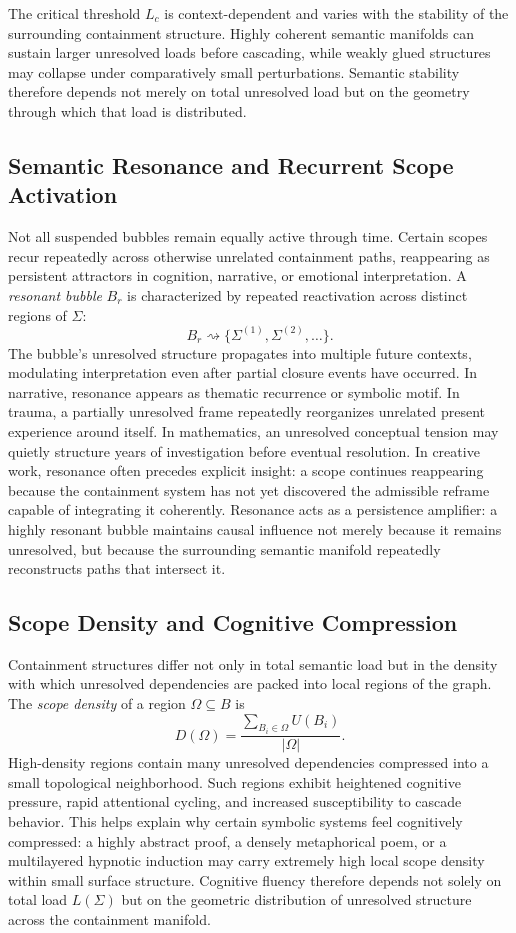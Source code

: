 \documentclass[12pt, a4paper]{article}
\theoremstyle{plain}
\theoremstyle{definition}
\theoremstyle{remark}
\begin{document}
The critical threshold $L_c$ is context-dependent and varies with the
stability of the surrounding containment structure. Highly coherent semantic
manifolds can sustain larger unresolved loads before cascading, while weakly
glued structures may collapse under comparatively small perturbations.
Semantic stability therefore depends not merely on total unresolved load but
on the geometry through which that load is distributed.

\subsection{Semantic Resonance and Recurrent Scope Activation}

Not all suspended bubbles remain equally active through time. Certain scopes
recur repeatedly across otherwise unrelated containment paths, reappearing as
persistent attractors in cognition, narrative, or emotional interpretation. A
\emph{resonant bubble} $B_r$ is characterized by repeated reactivation across
distinct regions of $\Sigma$:
\[
  B_r \rightsquigarrow \{ \Sigma^{(1)}, \Sigma^{(2)}, \ldots \}.
\]
The bubble's unresolved structure propagates into multiple future contexts,
modulating interpretation even after partial closure events have occurred. In
narrative, resonance appears as thematic recurrence or symbolic motif. In
trauma, a partially unresolved frame repeatedly reorganizes unrelated present
experience around itself. In mathematics, an unresolved conceptual tension may
quietly structure years of investigation before eventual resolution. In
creative work, resonance often precedes explicit insight: a scope continues
reappearing because the containment system has not yet discovered the
admissible reframe capable of integrating it coherently. Resonance acts as a
persistence amplifier: a highly resonant bubble maintains causal influence not
merely because it remains unresolved, but because the surrounding semantic
manifold repeatedly reconstructs paths that intersect it.

\subsection{Scope Density and Cognitive Compression}

Containment structures differ not only in total semantic load but in the
density with which unresolved dependencies are packed into local regions of
the graph. The \emph{scope density} of a region $\Omega \subseteq B$ is
\[
  D(\Omega) = \frac{\displaystyle\sum_{B_i \in \Omega} U(B_i)}{|\Omega|}.
\]
High-density regions contain many unresolved dependencies compressed into a
small topological neighborhood. Such regions exhibit heightened cognitive
pressure, rapid attentional cycling, and increased susceptibility to cascade
behavior. This helps explain why certain symbolic systems feel cognitively
compressed: a highly abstract proof, a densely metaphorical poem, or a
multilayered hypnotic induction may carry extremely high local scope density
within small surface structure. Cognitive fluency therefore depends not solely
on total load $L(\Sigma)$ but on the geometric distribution of unresolved
structure across the containment manifold.
\end{document}
